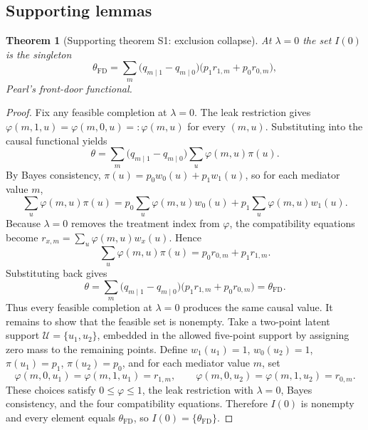 \documentclass[11pt]{article}
\theoremstyle{definition}
\theoremstyle{plain}
\newtheorem{theorem}{Theorem}
\theoremstyle{remark}
\begin{document}
\subsection*{Supporting lemmas}
\begin{theorem}[Supporting theorem S1: exclusion collapse]\label{thm:collapse}
At \(\lambda=0\) the set \(I(0)\) is the singleton
\[
  \theta_{\mathrm{FD}}=\sum_{m}\bigl(q_{m\mid1}-q_{m\mid0}\bigr)\bigl(p_1 r_{1,m}+p_0 r_{0,m}\bigr),
\]
Pearl's front-door functional.
\end{theorem}
\begin{proof}
Fix any feasible completion at \(\lambda=0\). The leak restriction gives \(\varphi(m,1,u)=\varphi(m,0,u)=: \varphi(m,u)\) for every \((m,u)\). Substituting into the causal functional yields
\[
  \theta=\sum_m\bigl(q_{m\mid1}-q_{m\mid0}\bigr)\sum_u \varphi(m,u)\pi(u).
\]
By Bayes consistency, \(\pi(u)=p_0 w_0(u)+p_1 w_1(u)\), so for each mediator value \(m\),
\[
  \sum_u \varphi(m,u)\pi(u)=p_0\sum_u \varphi(m,u)w_0(u)+p_1\sum_u \varphi(m,u)w_1(u).
\]
Because \(\lambda=0\) removes the treatment index from \(\varphi\), the compatibility equations become
\(r_{x,m}=\sum_u \varphi(m,u)w_x(u)\). Hence
\[
  \sum_u \varphi(m,u)\pi(u)=p_0 r_{0,m}+p_1 r_{1,m}.
\]
Substituting back gives
\[
  \theta=\sum_m\bigl(q_{m\mid1}-q_{m\mid0}\bigr)\bigl(p_1 r_{1,m}+p_0 r_{0,m}\bigr)=\theta_{\mathrm{FD}}.
\]
Thus every feasible completion at \(\lambda=0\) produces the same causal value. It remains to show that the feasible set is nonempty. Take a two-point latent support \(\mathcal U=\{u_1,u_2\}\), embedded in the allowed five-point support by assigning zero mass to the remaining points. Define \(w_1(u_1)=1\), \(w_0(u_2)=1\), \(\pi(u_1)=p_1\), \(\pi(u_2)=p_0\), and for each mediator value \(m\), set
\[
  \varphi(m,0,u_1)=\varphi(m,1,u_1)=r_{1,m},\qquad\varphi(m,0,u_2)=\varphi(m,1,u_2)=r_{0,m}.
\]
These choices satisfy \(0\le \varphi\le 1\), the leak restriction with \(\lambda=0\), Bayes consistency, and the four compatibility equations. Therefore \(I(0)\) is nonempty and every element equals \(\theta_{\mathrm{FD}}\), so \(I(0)=\{\theta_{\mathrm{FD}}\}\).
\end{proof}
\end{document}
